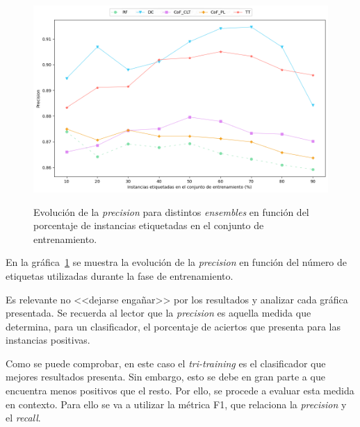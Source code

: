 \begin{figure}[h]
	\caption[\textit{Phishing}: comparativa SL contra SSL (\textit{precision})]{Evolución de la \textit{precision} para distintos \textit{ensembles} en función del porcentaje de instancias etiquetadas en el conjunto de entrenamiento.}
	\centering
	\includegraphics[scale=0.45]{../img/memoria/5_phishing/f1f19_evolution_prec}
	\label{gr:ph-f1f19_sl-ssl-prec}
\end{figure}

En la gráfica~\ref{gr:ph-f1f19_sl-ssl-prec} se muestra la evolución de la \textit{precision} en función del número de etiquetas utilizadas durante la fase de entrenamiento.

Es relevante no <<dejarse engañar>> por los resultados y analizar cada gráfica presentada. Se recuerda al lector que la \textit{precision} es aquella medida que determina, para un clasificador, el porcentaje de aciertos que presenta para las instancias positivas.

Como se puede comprobar, en este caso el \textit{tri-training} es el clasificador que mejores resultados presenta. Sin embargo, esto se debe en gran parte a que encuentra menos positivos que el resto. Por ello, se procede a evaluar esta medida en contexto. Para ello se va a utilizar la métrica F1, que relaciona la \textit{precision} y el \textit{recall}.

